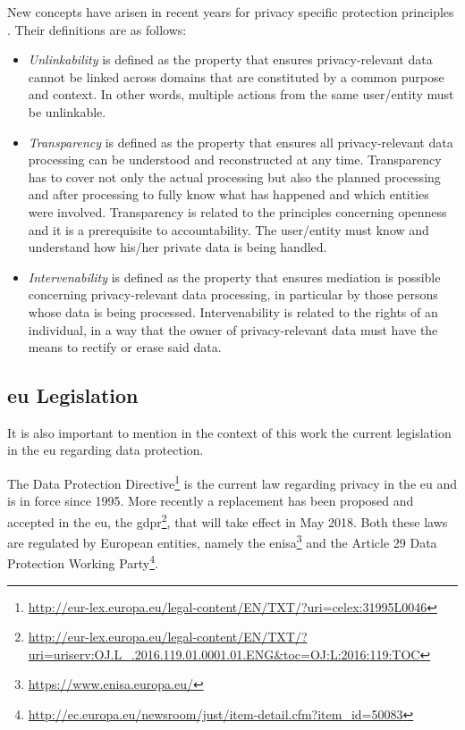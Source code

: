 New concepts have arisen in recent years for privacy specific protection principles \cite{Danezis2015}. Their definitions are as follows:

\begin{itemize}

\item \textit{Unlinkability} is defined as the property that ensures privacy-relevant data cannot be linked across domains that are constituted by a common purpose and context. In other words, multiple actions from the same user/entity must be unlinkable.

\item \textit{Transparency} is defined as the property that ensures all privacy-relevant data processing can be understood and reconstructed at any time. Transparency has to cover not only the actual processing but also the planned processing and after processing to fully know what has happened and which entities were involved. Transparency is related to the principles concerning openness and it is a prerequisite to accountability. The user/entity must know and understand how his/her private data is being handled.

\item \textit{Intervenability} is defined as the property that ensures mediation is possible concerning privacy-relevant data processing, in particular by those persons whose data is being processed. Intervenability is related to the rights of an individual, in a way that the owner of privacy-relevant data must have the means to rectify or erase said data.

\end{itemize}


\subsection{\acl{eu} Legislation}
\label{ssec:EuropeanUnionLegislation}

It is also important to mention in the context of this work the current legislation in the \ac{eu} regarding data protection.

 The Data Protection Directive\footnote{\url{http://eur-lex.europa.eu/legal-content/EN/TXT/?uri=celex:31995L0046}} is the current law regarding privacy in the \ac{eu} and is in force since 1995.
More recently a replacement has been proposed and accepted in the \ac{eu}, the \ac{gdpr}\footnote{\url{http://eur-lex.europa.eu/legal-content/EN/TXT/?uri=uriserv:OJ.L_.2016.119.01.0001.01.ENG&toc=OJ:L:2016:119:TOC}}, that will take effect in May 2018. Both these laws are regulated by European entities, namely the \ac{enisa}\footnote{\url{https://www.enisa.europa.eu/}} and the Article 29 Data Protection Working Party\footnote{\url{http://ec.europa.eu/newsroom/just/item-detail.cfm?item_id=50083}}.



